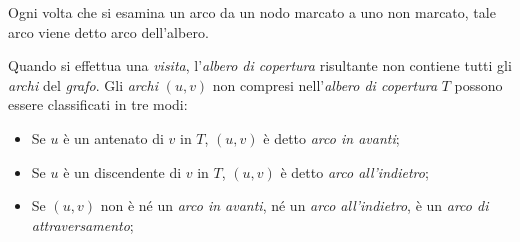 \begin{definition}
    Ogni volta che si esamina un arco da un nodo marcato a uno non marcato, tale
    arco viene detto arco dell'albero.
\end{definition}\noindent
Quando si effettua una \emph{visita}, l'\emph{albero di copertura} risultante
non contiene tutti gli \emph{archi} del \emph{grafo}. Gli \emph{archi} $(u,v)$ non
compresi nell'\emph{albero di copertura} $T$ possono essere classificati in tre modi:
\begin{itemize}
    \item Se $u$ è un antenato di $v$ in $T$, $(u,v)$ è detto \emph{arco in avanti};
    \item Se $u$ è un discendente di $v$ in $T$, $(u,v)$ è detto \emph{arco all'indietro};
    \item Se $(u,v)$ non è né un \emph{arco in avanti}, né un \emph{arco
    all'indietro}, è un \emph{arco di attraversamento};
\end{itemize}

